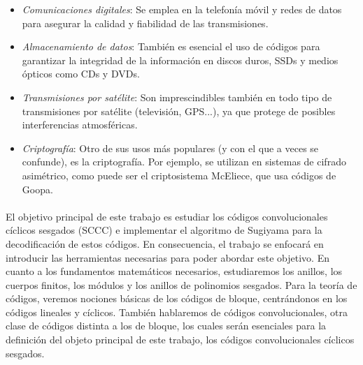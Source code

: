 \begin{itemize}
    \item \emph{Comunicaciones digitales}: Se emplea en la telefonía móvil y redes de datos para asegurar la calidad y fiabilidad de las transmisiones.
    \item \emph{Almacenamiento de datos}: También es esencial el uso de códigos para garantizar la integridad de la información en discos duros, SSDs y medios ópticos como CDs y DVDs.
    \item \emph{Transmisiones por satélite}: Son imprescindibles también en todo tipo de transmisiones por satélite (televisión, GPS...), ya que protege de posibles interferencias atmosféricas.
    \item \emph{Criptografía}: Otro de sus usos más populares (y con el que a veces se confunde), es la criptografía. Por ejemplo, se utilizan en sistemas de cifrado asimétrico, como puede ser el criptosistema McEliece, que usa códigos de Goopa.
\end{itemize}


\paragraph{}
\phantom{}

El objetivo principal de este trabajo es estudiar los códigos convolucionales cíclicos sesgados (SCCC) e implementar el algoritmo de Sugiyama para la decodificación de estos códigos. En consecuencia, el trabajo se enfocará en introducir las herramientas necesarias para poder abordar este objetivo. En cuanto a los fundamentos matemáticos necesarios, estudiaremos los anillos, los cuerpos finitos, los módulos y los anillos de polinomios sesgados. Para la teoría de códigos, veremos nociones básicas de los códigos de bloque, centrándonos en los códigos lineales y cíclicos. También hablaremos de códigos convolucionales, otra clase de códigos distinta a los de bloque, los cuales serán esenciales para la definición del objeto principal de este trabajo, los códigos convolucionales cíclicos sesgados.


\paragraph{}
\phantom{}


